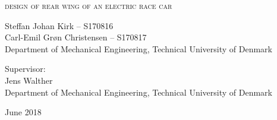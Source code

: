 \begin{titlingpage}

\begin{center}

\vspace*{0cm}
\HUGE
\textsc{design of rear wing of an electric race car}\\
\vspace{1.5cm}

%
\vspace{1.2cm}
\large
{
  Steffan Johan Kirk -- S170816\\
    Carl-Emil Grøn Christensen -- S170817\\
    Department of Mechanical Engineering, Technical University of Denmark
}
\vspace{1.5cm}

{
  Supervisor:\\
  Jens Walther\\
  Department of Mechanical Engineering, Technical University of Denmark
}

\vspace{1.5cm}
{June 2018}\\


\end{center}



\end{titlingpage}
